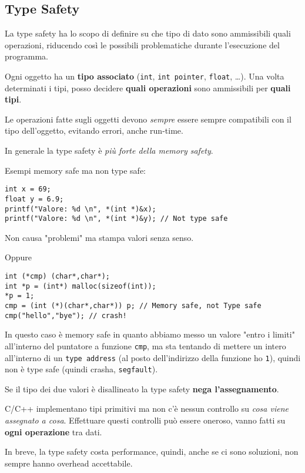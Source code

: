 
\subsection{Type Safety}

La type safety ha lo scopo di definire su che tipo di dato sono ammissibili quali operazioni, riducendo così le possibili problematiche durante l'esecuzione del programma.

Ogni oggetto ha un \textbf{tipo associato} (\texttt{int}, \texttt{int pointer}, \texttt{float}, \dots). Una volta determinati i tipi, posso decidere \textbf{quali operazioni} sono ammissibili per \textbf{quali tipi}. 

Le operazioni fatte sugli oggetti devono \textit{sempre} essere sempre compatibili con il tipo dell'oggetto, evitando errori, anche run-time.

In generale la type safety è \textit{più forte della memory safety}. 

Esempi memory safe ma non type safe:
\begin{verbatim}
int x = 69;
float y = 6.9;
printf("Valore: %d \n", *(int *)&x);
printf("Valore: %d \n", *(int *)&y); // Not type safe
\end{verbatim}
Non causa "problemi" ma stampa valori senza senso.

Oppure
\begin{verbatim}
int (*cmp) (char*,char*);
int *p = (int*) malloc(sizeof(int));
*p = 1;
cmp = (int (*)(char*,char*)) p; // Memory safe, not Type safe
cmp("hello","bye"); // crash!
\end{verbatim}

In questo caso è memory safe in quanto abbiamo messo un valore "entro i limiti" all'interno del puntatore a funzione \texttt{cmp}, ma sta tentando di mettere un intero all'interno di un \texttt{type address} (al posto dell'indirizzo della funzione ho \texttt{1}), quindi non è type safe (quindi crasha, \texttt{segfault}). 

Se il tipo dei due valori è disallineato la type safety \textbf{nega l'assegnamento}.

C/C++ implementano tipi primitivi ma non c'è nessun controllo su \textit{cosa viene assegnato a cosa}. Effettuare questi controlli può essere oneroso, vanno fatti su \textbf{ogni operazione} tra dati. 

In breve, la type safety costa performance, quindi, anche se ci sono soluzioni, non sempre hanno overhead accettabile. 

